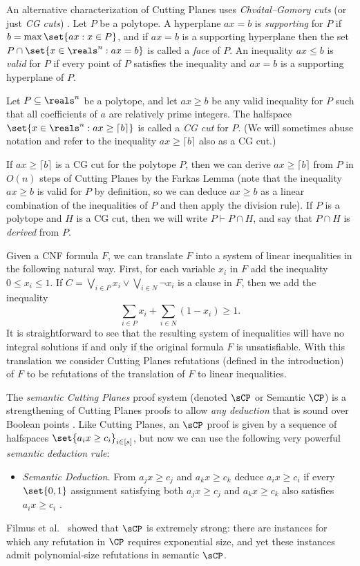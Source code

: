 \documentclass{toc}
\begin{document}
An alternative characterization of Cutting Planes uses
\emph{Chv\'{a}tal--Gomory cuts} (or just \emph{CG cuts}) \cite{CookCT87, Chvatal73a}.
Let $P$ be a polytope.
A hyperplane $ax = b$ is \emph{supporting} for $P$ if $b = \max \set{ax : x \in P}$, and if $ax = b$ is a supporting hyperplane then the set $P \cap \set{x \in \reals^n : ax = b}$ is called a \emph{face} of $P$.
An inequality $ax \leq b$ is \emph{valid} for $P$ if every point of $P$ satisfies the inequality and $ax = b$ is a supporting hyperplane of $P$.
\begin{definition}\label{def:cg-cut}
	Let $P \subseteq \reals^n$ be a polytope, and let $ax \geq b$ be any valid inequality for $P$ such that all coefficients of $a$ are relatively prime integers.
	The halfspace $\set{x \in \reals^n : ax \geq \lceil b \rceil}$ is called a \emph{CG cut} for $P$. (We will sometimes abuse notation and refer to the inequality $ax \geq \lceil b \rceil$ also as a CG cut.)
\end{definition}
If $ax \geq \lceil b \rceil$ is a CG cut for the polytope $P$, then we can derive $ax \geq \lceil b \rceil$ from $P$ in $O(n)$ steps of Cutting Planes by
the  %
Farkas Lemma (note that the inequality $ax \geq b$ is valid for $P$ by definition, so we can deduce $ax \geq b$ as a linear combination of the inequalities of $P$ and then apply the division rule).
If $P$ is a polytope and $H$ is a CG cut, then we will write $P \vdash P \cap H$, and say that $P \cap H$ is \emph{derived} from $P$.


Given a CNF formula $F$, we can translate $F$ into a system of linear inequalities in the following natural way.
First, for each variable $x_i$ in $F$ add the inequality $0 \leq x_i \leq 1$.
If $C = \bigvee_{i \in P} x_i \vee \bigvee_{i \in N} \neg x_i$ is a clause in $F$, then we add the inequality \[\sum_{i \in P} x_i + \sum_{i \in N} (1-x_i) \geq 1. \]
It is straightforward to see that the resulting system of inequalities will have no integral solutions if and only if the original formula $F$ is unsatisfiable.
With this translation we consider Cutting Planes refutations (defined in the introduction) of $F$ to be refutations of the translation of $F$ to linear inequalities.



The \emph{semantic Cutting Planes} proof system (denoted $\sCP$ or Semantic $\CP$) is a strengthening of Cutting Planes proofs to allow \emph{any deduction} that is sound over Boolean points \cite{BonetPR97}.
Like Cutting Planes, an $\sCP$ proof is given by a sequence of halfspaces $\set{a_ix \geq c_i}_{i \in [s]}$, but now we can use the following very powerful \emph{semantic deduction rule}:
\begin{itemize}
	\item \emph{Semantic Deduction.} From $a_j x \geq c_j$ and $a_k x \geq c_k$ deduce $a_i x \geq c_i$ if every $\set{0,1}$ assignment satisfying both $a_jx \geq c_j$ and $a_k x \geq c_k$  also satisfies $a_ix \geq c_i$ .
\end{itemize}
Filmus et al.~\cite{FilmusHL16} showed that $\sCP$ is extremely strong: there are instances for which any refutation in $\CP$ requires exponential size, and yet these instances admit  polynomial-size refutations in semantic $\sCP$. 
\end{document}
